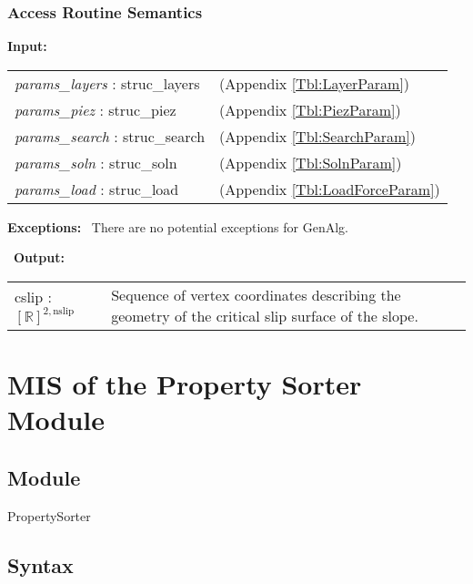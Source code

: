 \documentclass[12pt, titlepage]{article}
\begin{document}
\subsubsection{Access Routine Semantics}
\textbf{Input:} 
\renewcommand*{\arraystretch}{1.5}
\begin{longtable}{p{} p{}}
\textit{params\_layers} : struc\_layers & (Appendix \ref{Tbl:LayerParam})\\

\textit{params\_piez} : struc\_piez & (Appendix \ref{Tbl:PiezParam})\\

\textit{params\_search} : struc\_search & (Appendix
\ref{Tbl:SearchParam})\\

\textit{params\_soln} : struc\_soln & (Appendix
\ref{Tbl:SolnParam})\\

\textit{params\_load} : struc\_load & (Appendix
\ref{Tbl:LoadForceParam})\\
\end{longtable}

\noindent \textbf{Exceptions:} ~\newline\noindent There are
no potential exceptions for GenAlg.

~\newline\noindent \textbf{Output:}
\begin{longtable}{p{} p{}}
  cslip : $[\mathbb{R}]^{2,\text{nslip}}$ & Sequence of vertex
  coordinates describing the geometry of the critical slip surface of
  the slope.
\end{longtable}


\section{MIS of the Property Sorter Module} \label{sec:PropSortMod}

\subsection{Module} 
PropertySorter

\subsection{Syntax}
\end{document}
